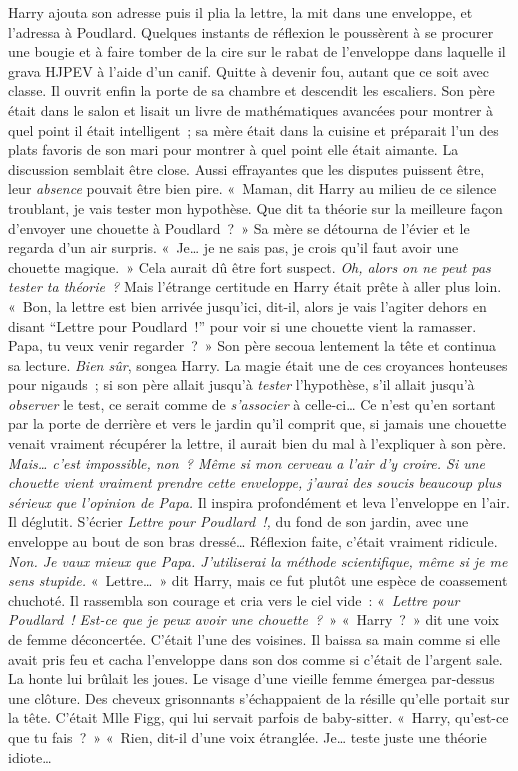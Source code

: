 Harry ajouta son adresse puis il plia la lettre, la mit dans une enveloppe, et l'adressa à Poudlard. Quelques instants de réflexion le poussèrent à se procurer une bougie et à faire tomber de la cire sur le rabat de l'enveloppe dans laquelle il grava HJPEV à l'aide d'un canif. Quitte à devenir fou, autant que ce soit avec classe.
Il ouvrit enfin la porte de sa chambre et descendit les escaliers. Son père était dans le salon et lisait un livre de mathématiques avancées pour montrer à quel point il était intelligent~; sa mère était dans la cuisine et préparait l'un des plats favoris de son mari pour montrer à quel point elle était aimante. La discussion semblait être close. Aussi effrayantes que les disputes puissent être, leur \emph{absence} pouvait être bien pire.
«~Maman, dit Harry au milieu de ce silence troublant, je vais tester mon hypothèse. Que dit ta théorie sur la meilleure façon d'envoyer une chouette à Poudlard~?~»
Sa mère se détourna de l'évier et le regarda d'un air surpris. «~Je… je ne sais pas, je crois qu'il faut avoir une chouette magique.~»
Cela aurait dû être fort suspect. \emph{Oh, alors on ne peut pas tester ta théorie~?} Mais l'étrange certitude en Harry était prête à aller plus loin.
«~Bon, la lettre est bien arrivée jusqu'ici, dit-il, alors je vais l'agiter dehors en disant “Lettre pour Poudlard~!” pour voir si une chouette vient la ramasser. Papa, tu veux venir regarder~?~»
Son père secoua lentement la tête et continua sa lecture. \emph{Bien sûr}, songea Harry. La magie était une de ces croyances honteuses pour nigauds~; si son père allait jusqu'à \emph{tester} l'hypothèse, s'il allait jusqu'à \emph{observer} le test, ce serait comme de \emph{s'associer} à celle-ci…
Ce n'est qu'en sortant par la porte de derrière et vers le jardin qu'il comprit que, si jamais une chouette venait vraiment récupérer la lettre, il aurait bien du mal à l'expliquer à son père.
\emph{Mais… c'est impossible, non~? Même si mon cerveau a l'air d'y croire. Si une chouette vient vraiment prendre cette enveloppe, j'aurai des soucis beaucoup plus sérieux que l'opinion de Papa.}
Il inspira profondément et leva l'enveloppe en l'air.
Il déglutit.
S'écrier \emph{Lettre pour Poudlard~!,} du fond de son jardin, avec une enveloppe au bout de son bras dressé… Réflexion faite, c'était vraiment ridicule.
\emph{Non. Je vaux mieux que Papa. J'utiliserai la méthode scientifique, même si je me sens stupide.}
«~Lettre…~» dit Harry, mais ce fut plutôt une espèce de coassement chuchoté.
Il rassembla son courage et cria vers le ciel vide~: «~\emph{Lettre pour Poudlard~! Est-ce que je peux avoir une chouette~?}~»
«~Harry~?~» dit une voix de femme déconcertée. C'était l'une des voisines.
Il baissa sa main comme si elle avait pris feu et cacha l'enveloppe dans son dos comme si c'était de l'argent sale. La honte lui brûlait les joues.
Le visage d'une vieille femme émergea par-dessus une clôture. Des cheveux grisonnants s'échappaient de la résille qu'elle portait sur la tête. C'était Mlle Figg, qui lui servait parfois de baby-sitter. «~Harry, qu'est-ce que tu fais~?~»
«~Rien, dit-il d'une voix étranglée. Je… teste juste une théorie idiote…

